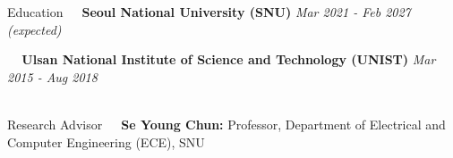 \documentclass{resume} %
\begin{document}
\begin{rSection}{Education}
\textbullet~\,\, {\bf Seoul National University (SNU)} \hfill {\it Mar 2021 - Feb 2027 (expected)}
\\\hspace*{1.5em}{Combined M.S./Ph.D Program in Electrical and Computer Engineering (ECE)}

\textbullet~\,\, {\bf Ulsan National Institute of Science and Technology (UNIST)} \hfill {\it Mar 2015 - Aug 2018}
\\\hspace*{1.5em}{B.S. in Electrical Engineering, GPA: 4.04/4.30}\\

\end{rSection}
\begin{rSection}{Research Advisor}
\textbullet~\,\,\,\,{\bf Se Young Chun:}{ Professor, Department of Electrical and Computer Engineering (ECE), SNU} \\
\end{rSection}
\end{document}
